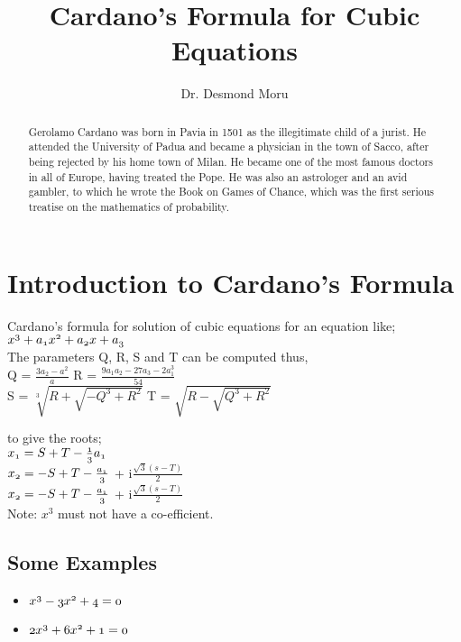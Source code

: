 \documentclass{article}
\begin{document}
	\title{Cardano's Formula for Cubic Equations}
	\author{Dr. Desmond Moru}
	\maketitle
	
	\begin{abstract}
		Gerolamo Cardano was born in Pavia in 1501 as the illegitimate child of a jurist. He attended the University of Padua and became a physician in the town of Sacco, after being rejected by his home town of Milan. He became one of the most famous doctors in all of Europe, having treated the Pope. He was also an astrologer and an avid gambler, to which he wrote the Book on Games of Chance, which was the first serious treatise on the mathematics of probability.\cite{cardanobib}
		\end{abstract}


\section{Introduction to Cardano's Formula}
Cardano's formula for solution of cubic equations for an equation like; \\
	$\mathnormal{x^{3} + a_{1}x^{2} +a_{2}x +a_{3}}$ \\
	The parameters Q, R, S and T can be computed  thus, \\

	Q = $\frac{3a_{2}-a^{2}}{a}$ \hspace{2.9cm} R = $\frac{9a_{1}a_{2}-27a_{3}-2a^{3}_{1}}{54}$ 
	\\
	
	S = $\sqrt[3]{R + \sqrt{-Q^{3} + R^{2}}}$ \hspace{1cm} T = $\sqrt{R - \sqrt{Q^{3} + R^{2}}} $ 
	\\
	\begin{flushleft}
	to give the roots; 
	\\

	$\mathnormal{x_{1} = S + T - \frac{1}{3}a_{1}}$ 
	\\
	$\mathnormal{x_{2} = -S + T - \frac{a_{1}}{3}}$ + i$\frac{\sqrt{3}(s-T)}{2}$ 
	\\
	$\mathnormal{x_{2} = -S + T - \frac{a_{1}}{3}}$ + i$\frac{\sqrt{3}(s-T)}{2}$ 
	\\
	
	Note: $x^{3}$ must not have a co-efficient.
	
	\subsection{Some Examples}
	\begin{itemize}
		\item $\mathnormal{x^{3} - 3x^{2} + 4 = 0}$
		\item $\mathnormal{2x^{3} + 6x^{2} + 1 = 0}$
	\end{itemize}
	\end{flushleft}
	
	
\end{document}
